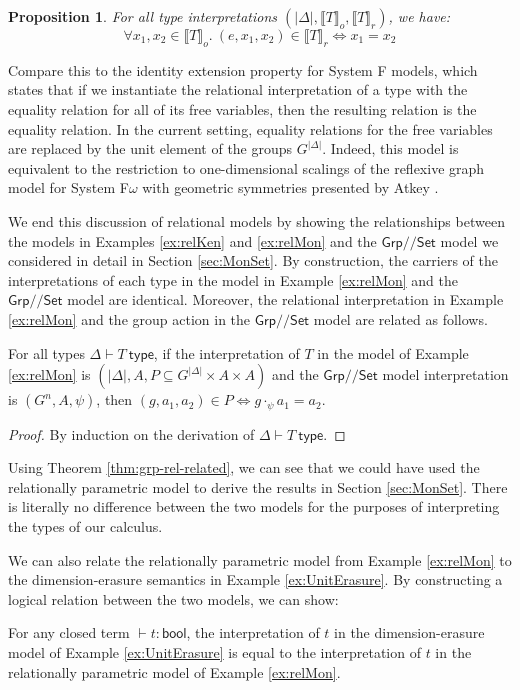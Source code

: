 \documentclass[a4paper,UKenglish]{lipics}
\theoremstyle{plain}
\newtheorem{proposition}[theorem]{Proposition}
\newcommand{\msf}[1]{\mathsf{#1}} %
\newcommand{\Grp}{\msf{Grp}}
\newcommand{\Set}{\msf{Set}}
\newcommand{\Lslice}[1]{#1/\!/\Set}
\newcommand{\GrpSet}{\Lslice{\Grp}}
\newcommand{\semo}[1]{\ensuremath{\llbracket #1 \rrbracket _o}}
\newcommand{\semr}[1]{\ensuremath{\llbracket #1 \rrbracket _r}}
\begin{document}
\begin{example}
  \begin{proposition}
For all type interpretations $(|\Delta|, \semo{T}, \semr{T})$, we have:
\begin{displaymath} \forall x_1, x_2 \in \semo{T}.~(e,x_1,x_2) \in \semr{T} \Leftrightarrow x_1 = x_2
\end{displaymath}
  \end{proposition}
  Compare this to the identity extension property for System F models,
  which states that if we instantiate the relational interpretation of
  a type with the equality relation for all of its free variables,
  then the resulting relation is the equality relation. In the current
  setting, equality relations for the free variables are replaced by
  the unit element of the groups $G^{|\Delta|}$. Indeed, this model is
  equivalent to the restriction to one-dimensional scalings of the
  reflexive graph model for System F$\omega$ with geometric symmetries
  presented by Atkey \cite{atkey14conservation}.
\end{example}

We end this discussion of relational models by showing the
relationships between the models in Examples \ref{ex:relKen} and
\ref{ex:relMon} and the $\GrpSet$ model we considered in detail in
Section \ref{sec:MonSet}. By construction, the carriers of the
interpretations of each type in the model in Example \ref{ex:relMon}
and the $\GrpSet$ model are identical. Moreover, the relational
interpretation in Example \ref{ex:relMon} and the group action in the
$\GrpSet$ model are related as follows.
\begin{theorem}\label{thm:grp-rel-related}
  For all types $\Delta \vdash T~\msf{type}$, if the interpretation of
  $T$ in the model of Example \ref{ex:relMon} is $(|\Delta|, A, P
  \subseteq G^{|\Delta|} \times A \times A)$ and the $\GrpSet$ model
  interpretation is $(G^n, A, \psi)$, then $(g, a_1, a_2) \in P
  \Leftrightarrow g \cdot_{\psi} a_1 = a_2$.
\end{theorem}
\begin{proof}
  By induction on the derivation of $\Delta \vdash T~\msf{type}$.
\end{proof}

Using Theorem \ref{thm:grp-rel-related}, we can see that we could have
used the relationally parametric model to derive the results in
Section \ref{sec:MonSet}. There is literally no difference between the
two models for the purposes of interpreting the types of our calculus.

We can also relate the relationally parametric model from Example
\ref{ex:relMon} to the dimension-erasure semantics in Example
\ref{ex:UnitErasure}. By constructing a logical relation between the
two models, we can show:
\begin{theorem}\label{thm:closed-prog-equiv}
  For any closed term $\vdash t : \msf{bool}$, the interpretation of
  $t$ in the dimension-erasure model of Example \ref{ex:UnitErasure}
  is equal to the interpretation of $t$ in the relationally parametric
  model of Example \ref{ex:relMon}.
\end{theorem}
\end{document}
